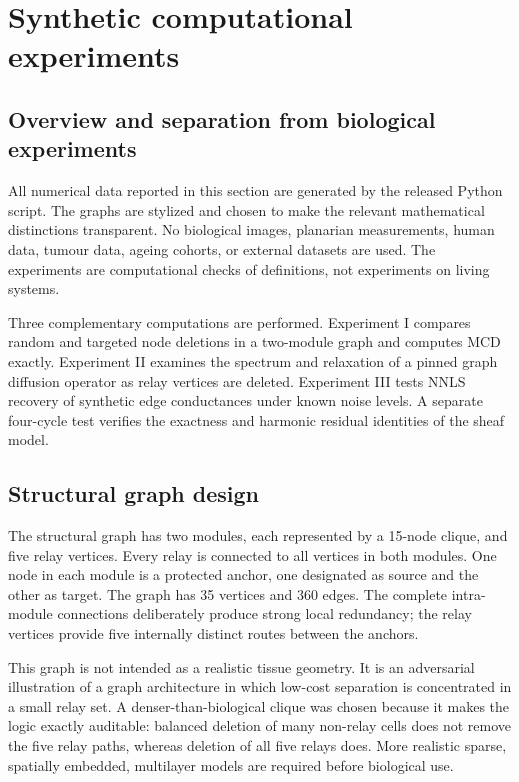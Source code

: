 \documentclass[12pt,a4paper]{article}
\begin{document}
\section{Synthetic computational experiments}
\subsection{Overview and separation from biological experiments}
All numerical data reported in this section are generated by the released Python script. The graphs are stylized and chosen to make the relevant mathematical distinctions transparent. No biological images, planarian measurements, human data, tumour data, ageing cohorts, or external datasets are used. The experiments are computational checks of definitions, not experiments on living systems.

Three complementary computations are performed. Experiment I compares random and targeted node deletions in a two-module graph and computes MCD exactly. Experiment II examines the spectrum and relaxation of a pinned graph diffusion operator as relay vertices are deleted. Experiment III tests NNLS recovery of synthetic edge conductances under known noise levels. A separate four-cycle test verifies the exactness and harmonic residual identities of the sheaf model.

\subsection{Structural graph design}
The structural graph has two modules, each represented by a 15-node clique, and five relay vertices. Every relay is connected to all vertices in both modules. One node in each module is a protected anchor, one designated as source and the other as target. The graph has 35 vertices and 360 edges. The complete intra-module connections deliberately produce strong local redundancy; the relay vertices provide five internally distinct routes between the anchors.

This graph is not intended as a realistic tissue geometry. It is an adversarial illustration of a graph architecture in which low-cost separation is concentrated in a small relay set. A denser-than-biological clique was chosen because it makes the logic exactly auditable: balanced deletion of many non-relay cells does not remove the five relay paths, whereas deletion of all five relays does. More realistic sparse, spatially embedded, multilayer models are required before biological use.
\end{document}
